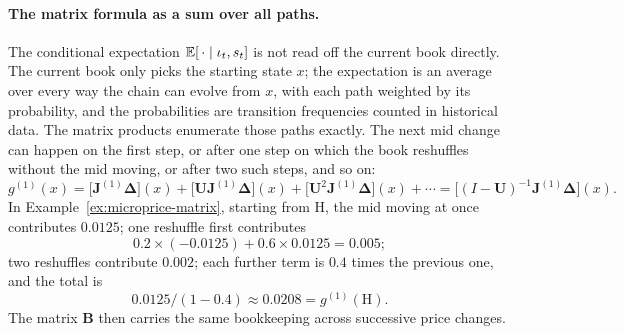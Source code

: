 \paragraph{The matrix formula as a sum over all paths.} The conditional expectation
$\mathbb{E}[\,\cdot \mid \iota_t, s_t]$ is not read off the current book directly. The current book only picks
the starting state $x$; the expectation is an average over every way the chain can evolve from $x$,
with each path weighted by its probability, and the probabilities are transition frequencies counted
in historical data. The matrix products enumerate those paths exactly. The next mid change can happen
on the first step, or after one step on which the book reshuffles without the mid moving, or after
two such steps, and so on:
\[
  g^{(1)}(x) = \big[\mathbf{J}^{(1)}\boldsymbol{\Delta}\big](x) + \big[\mathbf{U}\mathbf{J}^{(1)}\boldsymbol{\Delta}\big](x)
  + \big[\mathbf{U}^2\mathbf{J}^{(1)}\boldsymbol{\Delta}\big](x) + \cdots
  = \big[(I - \mathbf{U})^{-1}\mathbf{J}^{(1)}\boldsymbol{\Delta}\big](x).
\]
In Example~\ref{ex:microprice-matrix}, starting from H, the mid moving at once contributes $0.0125$;
one reshuffle first contributes 
\[
  0.2 \times (-0.0125) + 0.6 \times 0.0125 = 0.005;
\]
two reshuffles
contribute $0.002$; each further term is $0.4$ times the previous one, and the total is
\[
  0.0125/(1 - 0.4) \approx 0.0208 = g^{(1)}(\text{H}).
\]
The matrix $\mathbf{B}$ then carries the same
bookkeeping across successive price changes.

